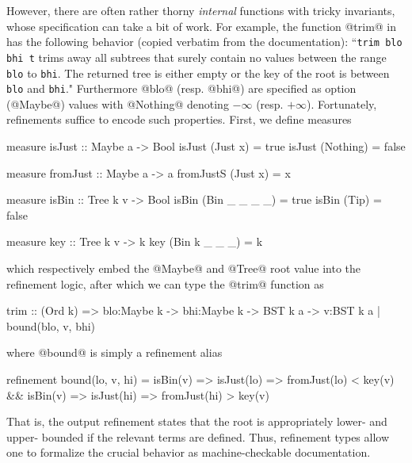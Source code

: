 However, there are often rather thorny \emph{internal} functions with tricky
invariants, whose specification can take a bit of work. For example, the
function @trim@ in {\benchMap} has the following behavior (copied verbatim
from the documentation):
``\verb-trim blo bhi t- trims away all subtrees that surely
  contain no values between the range \verb-blo- to \verb-bhi-. 
   The returned tree is either empty or the key of the 
   root is between \verb-blo- and \verb-bhi-."
Furthermore @blo@ (resp. @bhi@) are specified as option 
(\ie @Maybe@) values with @Nothing@ denoting $-\infty$ (resp. $+\infty$). 
%
Fortunately, refinements suffice to encode such properties. 
First, we define measures
%
\begin{code}
  measure isJust       :: Maybe a -> Bool 
    isJust (Just x)    = true
    isJust (Nothing)   = false

  measure fromJust     :: Maybe a -> a 
    fromJustS (Just x) = x 

  measure isBin         :: Tree k v -> Bool
    isBin (Bin _ _ _ _) = true
    isBin (Tip)         = false

  measure key :: Tree k v -> k 
    key (Bin k _ _ _)   = k 
\end{code}
%
which respectively embed the @Maybe@ and @Tree@ root value into the
refinement logic, after which we can type the @trim@ function as
\begin{code}
  trim :: (Ord k) => blo:Maybe k 
                  -> bhi:Maybe k 
                  -> BST k a 
                  -> {v:BST k a | bound(blo, v, bhi)}
\end{code}
where @bound@ is simply a refinement alias
\begin{code}
  refinement bound(lo, v, hi) 
    =  isBin(v) => isJust(lo) => fromJust(lo) < key(v) 
    &&  isBin(v) => isJust(hi) => fromJust(hi) > key(v)
\end{code}
That is, the output refinement states that the root is appropriately 
lower- and upper- bounded if the relevant terms are defined. 
Thus, refinement types allow one to formalize the crucial behavior as
machine-checkable documentation.

